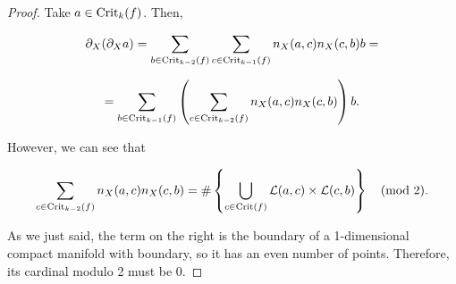 \begin{proof}
Take $a \in \text{Crit}_k(f)$. Then,

$$\partial_X (\partial_X a) = \sum_{b \in \text{Crit}_{k-2}(f)} \sum_{c \in \text{Crit}_{k-1}(f)} n_X(a,c) n_X(c,b) b =$$

$$= \sum_{b \in \text{Crit}_{k-1}(f)} \left( \sum_{c \in \text{Crit}_{k-2}(f)} n_X(a,c) n_X(c,b) \right) b .$$

However, we can see that

$$\sum_{c \in \text{Crit}_{k-2}(f)} n_X(a,c) n_X(c,b) = \# \left\{ \bigcup_{c \in \text{Crit}(f)} \mathcal{L}(a,c) \times \mathcal{L}(c,b) \right\} \quad (\text{mod } 2).$$

As we just said, the term on the right is the boundary of a 1-dimensional compact manifold with boundary, so it has an even number of points. Therefore, its cardinal modulo 2 must be 0.
\end{proof}

